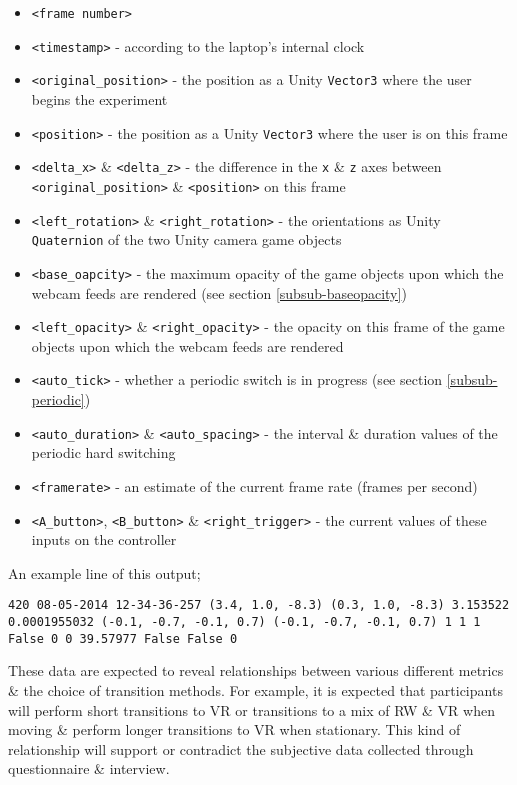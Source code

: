 \begin{itemize}
	\item \texttt{<frame number>}
	\item \texttt{<timestamp>} - according to the laptop's internal clock
	\item \texttt{<original\_position>} - the position as a Unity \texttt{Vector3} where the user begins the experiment
	\item \texttt{<position>} - the position as a Unity \texttt{Vector3} where the user is on this frame
	\item \texttt{<delta\_x>} \& \texttt{<delta\_z>} - the difference in the \texttt{x} \& \texttt{z} axes between \texttt{<original\_position>} \& \texttt{<position>} on this frame
	\item \texttt{<left\_rotation>} \& \texttt{<right\_rotation>} - the orientations as Unity \texttt{Quaternion} of the two Unity camera game objects
	\item \texttt{<base\_oapcity>} - the maximum opacity of the game objects upon which the webcam feeds are rendered (see section \ref{subsub-baseopacity})
	\item \texttt{<left\_opacity>} \& \texttt{<right\_opacity>} - the opacity on this frame of the game objects upon which the webcam feeds are rendered
	\item \texttt{<auto\_tick>} - whether a periodic switch is in progress (see section \ref{subsub-periodic})
	\item \texttt{<auto\_duration>} \& \texttt{<auto\_spacing>} - the interval \& duration values of the periodic hard switching
	\item \texttt{<framerate>} - an estimate of the current frame rate (frames per second)
	\item \texttt{<A\_button>}, \texttt{<B\_button>} \& \texttt{<right\_trigger>} - the current values of these inputs on the controller
\end{itemize}

\vspace{4mm}

An example line of this output;

\begin{center}
	\texttt{420	08-05-2014 12-34-36-257	(3.4, 1.0, -8.3)	(0.3, 1.0, -8.3)	3.153522	0.0001955032	(-0.1, -0.7, -0.1, 0.7)	(-0.1, -0.7, -0.1, 0.7)	1	1	1	False	0	0	39.57977	False	False	0}
\end{center}

These data are expected to reveal relationships between various different metrics \& the choice of transition methods. For example, it is expected that participants will perform short transitions to VR or transitions to a mix of RW \& VR when moving \& perform longer transitions to VR when stationary. This kind of relationship will support or contradict the subjective data collected through questionnaire \& interview.

